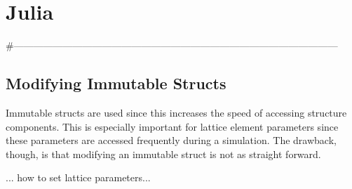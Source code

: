 \chapter{Julia}
\label{c:julia}

#---------------------------------------------------------------------------------------------------
\section{Modifying Immutable Structs}
\label{s:bmad.web}

Immutable structs are used since this increases the speed of accessing structure components. This is especially important for lattice element parameters since these parameters are accessed frequently during a simulation. The drawback, though, is that modifying an immutable struct is not as straight forward. 

... how to set lattice parameters...